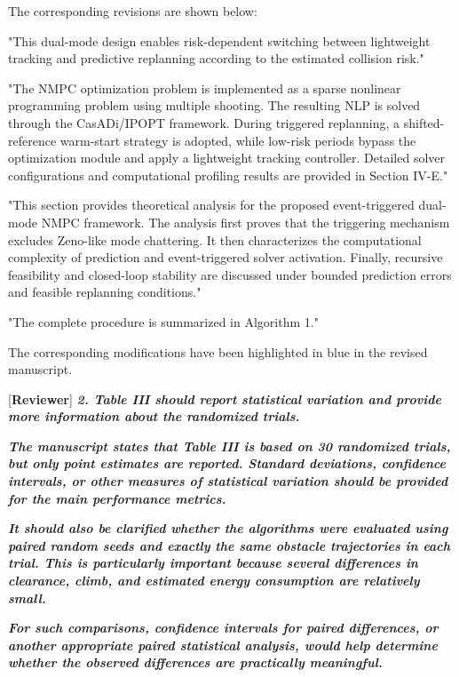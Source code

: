 \documentclass[12pt, twosides]{article}
\theoremstyle{definition}
\begin{document}
The corresponding revisions are shown below:

"This dual-mode design enables risk-dependent switching between lightweight tracking and predictive replanning according to the estimated collision risk."

"The NMPC optimization problem is implemented as a sparse nonlinear programming problem using multiple shooting. The resulting NLP is solved through the CasADi/IPOPT framework. During triggered replanning, a shifted-reference warm-start strategy is adopted, while low-risk periods bypass the optimization module and apply a lightweight tracking controller. Detailed solver configurations and computational profiling results are provided in Section IV-E."

"This section provides theoretical analysis for the proposed event-triggered dual-mode NMPC framework. The analysis first proves that the triggering mechanism excludes Zeno-like mode chattering. It then characterizes the computational complexity of prediction and event-triggered solver activation. Finally, recursive feasibility and closed-loop stability are discussed under bounded prediction errors and feasible replanning conditions."

"The complete procedure is summarized in Algorithm 1."

The corresponding modifications have been highlighted in blue in the revised manuscript.

\medskip

\textcolor[rgb]{0.00,0.00,1.00}{[\textbf {Reviewer}]} \textit{\textbf{2. Table III should report statistical variation and provide more information about the randomized trials.}}

\textit{\textbf{The manuscript states that Table III is based on 30 randomized trials, but only point estimates are reported. Standard deviations, confidence intervals, or other measures of statistical variation should be provided for the main performance metrics.}}

\textit{\textbf{It should also be clarified whether the algorithms were evaluated using paired random seeds and exactly the same obstacle trajectories in each trial. This is particularly important because several differences in clearance, climb, and estimated energy consumption are relatively small.}}

\textit{\textbf{For such comparisons, confidence intervals for paired differences, or another appropriate paired statistical analysis, would help determine whether the observed differences are practically meaningful.}}
\end{document}

